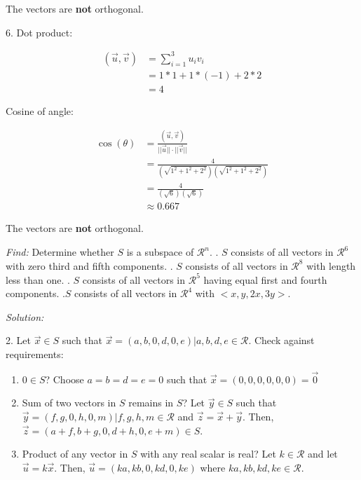 \documentclass[11pt]{homework}
\begin{document}
The vectors are \textbf{not} orthogonal.

6. Dot product:

\begin{align*}
(\vec u, \vec v) &= \sum_{i=1}^{3} u_i v_i \\
            &= 1 * 1 + 1 * (-1) + 2 *2 \\
            &= 4
\end{align*}

Cosine of angle:

\begin{align*}
\cos(\theta) &= \frac{ (\vec u, \vec v)}{  ||\vec u|| \cdot ||\vec v||} \\
             &= \frac{ 4}{  (\sqrt{1^2 + 1^2 + 2^2}) (\sqrt{1^2 + 1^2 + 2^2})} \\
             &= \frac{ 4}{  (\sqrt{6}) (\sqrt{6}) } \\
             &\approx 0.667
\end{align*}

The vectors are \textbf{not} orthogonal.

\newpage
{}
\emph{Find:}
\newline
Determine whether $S$ is a subspace of $\mathcal{R}^n$.
\newline
{}. $S$ consists of all vectors in $\mathcal{R}^6$ with zero third and fifth components.
. $S$ consists of all vectors in $\mathcal{R}^8$ with length less than one.
. $S$ consists of all vectors in $\mathcal{R}^5$ having equal first and fourth components.
.$S$ consists of all vectors in $\mathcal{R}^4$ with $<x, y, 2x, 3y>$.

\emph{Solution:}
\newline

2. Let $\vec x \in S$ such that $\vec x=(a, b, 0, d, 0, e) | a,b,d,e\in\mathcal{R}$.
Check against requirements:
\begin{enumerate}
  \item $0 \in S$? 
        Choose $a=b=d=e=0$ such that $\vec x = ( 0, 0, 0,0,0,0) = \vec 0$
  \item Sum of two vectors in $S$ remains in $S$? 
        Let $\vec y \in S$ such that 
         $\vec y=(f, g, 0, h, 0, m)|f,g,h,m \in \mathcal{R}$ and $\vec z = \vec x + \vec y$. 
         Then, $\vec z = ( a+f, b+g, 0, d+h, 0, e+m) \in S$.
  \item Product of any vector in $S$ with any real scalar is real? 
        Let $k \in \mathcal{R}$ and
         let $\vec u = k\vec x$. Then, $\vec u = ( ka, kb, 0, kd, 0, ke)$ where $ka, kb, kd, ke \in \mathcal{R}$.
\end{enumerate}
\end{document}
